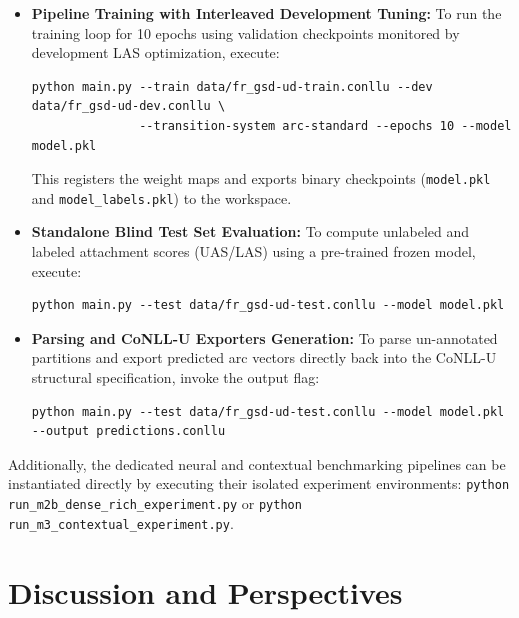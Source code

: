 \documentclass[12pt,a4paper]{article}
\begin{document}
\begin{itemize}
    \item \textbf{Pipeline Training with Interleaved Development Tuning:} To run the training loop for 10 epochs using validation checkpoints monitored by development LAS optimization, execute:
\begin{footnotesize}
\begin{verbatim}
python main.py --train data/fr_gsd-ud-train.conllu --dev data/fr_gsd-ud-dev.conllu \
               --transition-system arc-standard --epochs 10 --model model.pkl
\end{verbatim}
\end{footnotesize}
    This registers the weight maps and exports binary checkpoints (\texttt{model.pkl} and \texttt{model\_labels.pkl}) to the workspace.

    \item \textbf{Standalone Blind Test Set Evaluation:} To compute unlabeled and labeled attachment scores (UAS/LAS) using a pre-trained frozen model, execute:
\begin{footnotesize}
\begin{verbatim}
python main.py --test data/fr_gsd-ud-test.conllu --model model.pkl
\end{verbatim}
\end{footnotesize}

    \item \textbf{Parsing and CoNLL-U Exporters Generation:} To parse un-annotated partitions and export predicted arc vectors directly back into the CoNLL-U structural specification, invoke the output flag:
\begin{footnotesize}
\begin{verbatim}
python main.py --test data/fr_gsd-ud-test.conllu --model model.pkl --output predictions.conllu
\end{verbatim}
\end{footnotesize}
\end{itemize}

Additionally, the dedicated neural and contextual benchmarking pipelines can be instantiated directly by executing their isolated experiment environments: \texttt{python run\_m2b\_dense\_rich\_experiment.py} or \texttt{python run\_m3\_contextual\_experiment.py}.

\section{Discussion and Perspectives}
\label{sec:discussion_perspectives}
\end{document}
